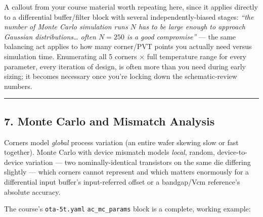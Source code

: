 \documentclass[
]{article}
\begin{document}
A callout from your course material worth repeating here, since it
applies directly to a differential buffer/filter block with several
independently-biased stages: \emph{``the number of Monte Carlo
simulation runs \(N\) has to be large enough to approach Gaussian
distributions\ldots{} often \(N=250\) is a good compromise''} --- the
same balancing act applies to how many corner/PVT points you actually
need versus simulation time. Enumerating all 5 corners × full
temperature range for every parameter, every iteration of design, is
often more than you need during early sizing; it becomes necessary once
you're locking down the schematic-review numbers.

\begin{center}\rule{0.5\linewidth}{0.5pt}\end{center}

\hypertarget{monte-carlo-and-mismatch-analysis}{%
\subsection{7. Monte Carlo and Mismatch
Analysis}\label{monte-carlo-and-mismatch-analysis}}

Corners model \emph{global} process variation (an entire wafer skewing
slow or fast together). Monte Carlo with device mismatch models
\emph{local}, random, device-to-device variation --- two
nominally-identical transistors on the same die differing slightly ---
which corners cannot represent and which matters enormously for a
differential input buffer's input-referred offset or a bandgap/Vcm
reference's absolute accuracy.

The course's \texttt{ota-5t.yaml} \texttt{ac\_mc\_params} block is a
complete, working example:
\end{document}
